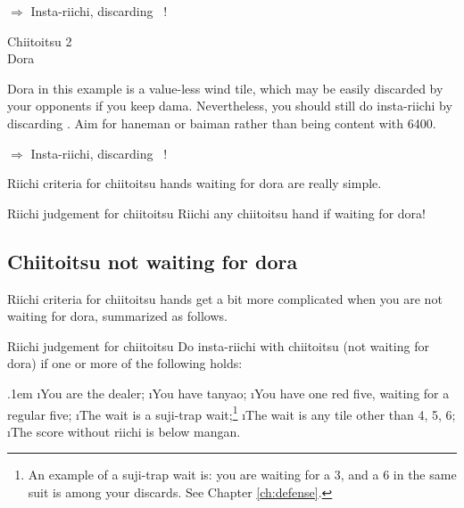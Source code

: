 \begin{center}
{\Large $\Rightarrow$ Insta-riichi, discarding  ~!}
\end{center}

\bigskip
\begin{itembox}[r]{{\jap Chiitoitsu 2}}
\bp
{}\xi{}\zhong\zhong\fa\fa~~\xi\\
\hfill\footnotesize{{\jap Dora}~~~~~~~}
\ep
\vspace{-15pt}
\end{itembox}
{\jap Dora} in this example is a value-less wind tile, which may be easily discarded by your opponents if you keep {\jap dama}. Nevertheless, you should still do insta-riichi by discarding {\LARGE {}}. Aim for {\jap haneman} or {\jap baiman} rather than being content with 6400. 

\begin{center}
{\Large $\Rightarrow$ Insta-riichi, discarding  ~!}
\end{center}

\bigskip

\noindent Riichi criteria for {\jap chiitoitsu} hands waiting for {\jap dora} are really simple. 

\begin{itembox}[c]{Riichi judgement for {\jap chiitoitsu}}
Riichi any {\jap chiitoitsu} hand if waiting for {\jap dora}!
\end{itembox}

\bigskip

\subsection{{\jap Chiitoitsu} not waiting for {\jap dora}}
Riichi criteria for {\jap chiitoitsu} hands get a bit more complicated when you are not waiting for {\jap dora}, summarized as follows.

\begin{itembox}[c]{Riichi judgement for {\jap chiitoitsu}}
Do insta-riichi with {\jap chiitoitsu} (not waiting for {\jap dora}) if one or more of the following holds:

\bi\itemsep.1em
\i You are the dealer;
\i You have {\jap tanyao};
\i You have one red five, waiting for a regular five;
\i The wait is a {\jap suji}-trap wait;\footnote{An example of a {\jap suji}-trap wait is: you are waiting for a 3, and a 6 in the same suit is among your discards. See Chapter \ref{ch:defense}.} 
\i The wait is any tile other than 4, 5, 6;
\i The score without riichi is below {\jap mangan}.
\ei \vsps
\end{itembox}

